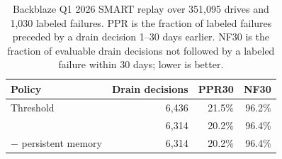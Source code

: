 \begin{table}[t]
  \centering
  \scriptsize
  \caption{Backblaze Q1 2026 SMART replay over 351,095 drives and 1,030 labeled failures. PPR is the fraction of labeled failures preceded by a drain decision 1--30 days earlier. NF30 is the fraction of evaluable drain decisions not followed by a labeled failure within 30 days; lower is better.}
  \label{tab:backblaze-results}
  \begin{tabular}{@{}lrrr@{}}
    \toprule
    Policy & Drain decisions & PPR30 & NF30 \\
    \midrule
    Threshold & 6,436 & 21.5\% & 96.2\% \\
    \autopilot{} & 6,314 & 20.2\% & 96.4\% \\
    $-$ persistent memory & 6,314 & 20.2\% & 96.4\% \\
    \bottomrule
  \end{tabular}
\end{table}

